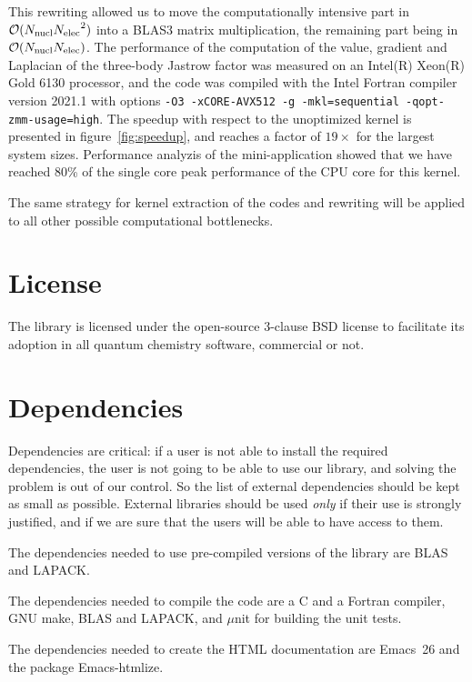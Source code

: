 This rewriting allowed us to move the computationally intensive part in
$\mathcal{O}(N_{\text{nucl}}{N_{\text{elec}}}^2)$ into a BLAS3 matrix multiplication, the
remaining part being in $\mathcal{O}(N_{\text{nucl}} N_{\text{elec}})$.
The performance of the computation of the value, gradient and Laplacian of
the three-body Jastrow factor was measured on an Intel(R) Xeon(R) Gold
6130 processor, and the code was compiled with the Intel Fortran
compiler version 2021.1 with options
\texttt{-O3 -xCORE-AVX512 -g -mkl=sequential -qopt-zmm-usage=high}.
The speedup with respect to the unoptimized kernel is presented in
figure~\ref{fig:speedup}, and reaches a factor of $19\times$ for the
largest system sizes. Performance analyzis of the mini-application
showed that we have reached 80\% of the single core peak performance
of the CPU core for this kernel.

The same strategy for kernel extraction of the codes and rewriting
will be applied to all other possible computational bottlenecks.


\section{License}

The library is licensed under the open-source 3-clause BSD license to facilitate
its adoption in all quantum chemistry software, commercial or not.

\section{Dependencies}

Dependencies are critical: if a user is not able to install the
required dependencies, the user is not going to be able to use our
library, and solving the problem is out of our control. So the list of
external dependencies should be kept as small as possible. 
External libraries should be used \emph{only} if their use is
strongly justified, and if we are sure that the users will be able to
have access to them.

The dependencies needed to use pre-compiled versions of the library
are \ac{BLAS} and \ac{LAPACK}.

The dependencies needed to compile the code are
a C and a Fortran compiler, GNU make, \ac{BLAS} and \ac{LAPACK}, and
$\mu$nit\cite{munit} for building the unit tests.

The dependencies needed to create the \ac{HTML} documentation are
Emacs~26 and the package Emacs-htmlize.


